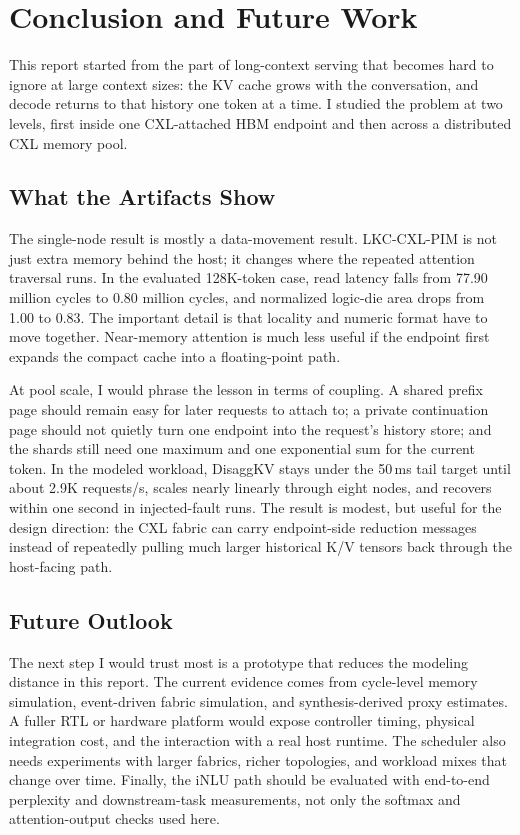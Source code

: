 \chapter{Conclusion and Future Work}
\label{ch:conclusion}

This report started from the part of long-context serving that becomes hard to ignore at large context sizes: the KV cache grows with the conversation, and decode returns to that history one token at a time. I studied the problem at two levels, first inside one CXL-attached HBM endpoint and then across a distributed CXL memory pool.

\section{What the Artifacts Show}

The single-node result is mostly a data-movement result. LKC-CXL-PIM is not just extra memory behind the host; it changes where the repeated attention traversal runs. In the evaluated 128K-token case, read latency falls from 77.90 million cycles to 0.80 million cycles, and normalized logic-die area drops from 1.00 to 0.83. The important detail is that locality and numeric format have to move together. Near-memory attention is much less useful if the endpoint first expands the compact cache into a floating-point path.

At pool scale, I would phrase the lesson in terms of coupling. A shared prefix page should remain easy for later requests to attach to; a private continuation page should not quietly turn one endpoint into the request's history store; and the shards still need one maximum and one exponential sum for the current token. In the modeled workload, DisaggKV stays under the 50\,ms tail target until about 2.9K requests/s, scales nearly linearly through eight nodes, and recovers within one second in injected-fault runs. The result is modest, but useful for the design direction: the CXL fabric can carry endpoint-side reduction messages instead of repeatedly pulling much larger historical K/V tensors back through the host-facing path.

\section{Future Outlook}

The next step I would trust most is a prototype that reduces the modeling distance in this report. The current evidence comes from cycle-level memory simulation, event-driven fabric simulation, and synthesis-derived proxy estimates. A fuller RTL or hardware platform would expose controller timing, physical integration cost, and the interaction with a real host runtime. The scheduler also needs experiments with larger fabrics, richer topologies, and workload mixes that change over time. Finally, the iNLU path should be evaluated with end-to-end perplexity and downstream-task measurements, not only the softmax and attention-output checks used here.

